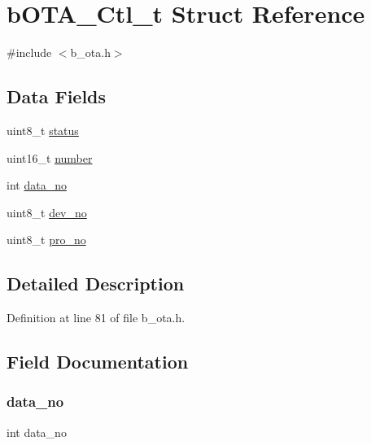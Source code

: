 \hypertarget{structb_o_t_a___ctl__t}{}\section{b\+O\+T\+A\+\_\+\+Ctl\+\_\+t Struct Reference}
\label{structb_o_t_a___ctl__t}


{\ttfamily \#include $<$b\+\_\+ota.\+h$>$}

\subsection*{Data Fields}
\begin{DoxyCompactItemize}
\item 
uint8\+\_\+t \mbox{\hyperlink{structb_o_t_a___ctl__t_ade818037fd6c985038ff29656089758d}{status}}
\item 
uint16\+\_\+t \mbox{\hyperlink{structb_o_t_a___ctl__t_adf69c46b3dd2878c66bab78eddc40b04}{number}}
\item 
int \mbox{\hyperlink{structb_o_t_a___ctl__t_a36b7cfe17c86a3b14ebc0e7b38da5684}{data\+\_\+no}}
\item 
uint8\+\_\+t \mbox{\hyperlink{structb_o_t_a___ctl__t_a858e2685fb0034acadcd8d48cf6f02b2}{dev\+\_\+no}}
\item 
uint8\+\_\+t \mbox{\hyperlink{structb_o_t_a___ctl__t_ad4a22c2100434cc2f3c30c99bb5a4caf}{pro\+\_\+no}}
\end{DoxyCompactItemize}


\subsection{Detailed Description}


Definition at line 81 of file b\+\_\+ota.\+h.



\subsection{Field Documentation}
\mbox{\label{structb_o_t_a___ctl__t_a36b7cfe17c86a3b14ebc0e7b38da5684}} 
\subsubsection{\texorpdfstring{data\+\_\+no}{data\_no}}
{\footnotesize\ttfamily int data\+\_\+no}



